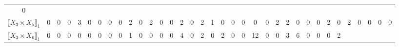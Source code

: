 \documentclass[12pt]{article}
\theoremstyle{definition}
\theoremstyle{remark}
\begin{document}
{\begin{table}[H]
\begin{adjustbox}{angle=90}
{\begin{tabular}{c||c|c|c|c|c|c|c|c|c|c|c|c|c|c|c|c|c|c|c|c|c|c|c|c|c|c|c|c|c|c|c|c|c|c}
0  %
\\
$\llbracket X_3 \times X_5 \rrbracket_1$ &
0  & %
0  & %
0  & %
3  & %
0  & %
0  & %
0  & %
0  & %
2  & %
0  & %
2  & %
0  & %
0  & %
2  & %
0  & %
2  & %
1  & %
0  & %
0  & %
0  & %
0  & %
0  & %
2  & %
2  & %
0  & %
0  & %
0  & %
2  & %
0  & %
2  & %
0  & %
0  & %
0  & %
0   %
\\
$\llbracket X_3 \times X_6 \rrbracket_1$ &
0  & %
0  & %
0  & %
0  & %
0  & %
0  & %
0  & %
0  & %
1  & %
0  & %
0  & %
0  & %
0  & %
4  & %
0  & %
2  & %
0  & %
2  & %
0  & %
0  & %
12  & %
0  & %
0  & %
3  & %
6  & %
0  & %
0  & %
0  & %
2  & %

\end{tabular}}
\end{adjustbox}
\end{table}}
\end{document}
